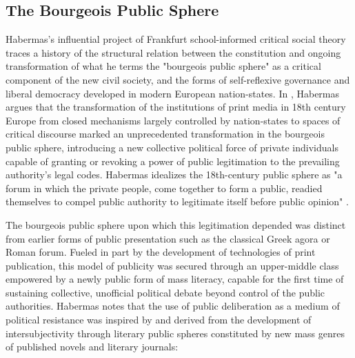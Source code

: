 \subsection*{The Bourgeois Public Sphere}
Habermas's influential project of Frankfurt school-informed critical social theory traces a history of the structural relation between the constitution and ongoing transformation of what he terms the "bourgeois public sphere" as a critical component of the new civil society, and the forms of self-reflexive governance and liberal democracy developed in modern European nation-states. In , Habermas argues that the transformation of the institutions of print media in 18th century Europe from closed mechanisms largely controlled by nation-states to spaces of critical discourse marked an unprecedented transformation in the bourgeois public sphere, introducing a new collective political force of private individuals capable of granting or revoking a power of public legitimation to the prevailing authority's legal codes. Habermas idealizes the 18th-century public sphere as "a forum in which the private people, come together to form a public, readied themselves to compel public authority to legitimate itself before public opinion" \autocite*[25--6]{Habermas1989}.

The bourgeois public sphere upon which this legitimation depended was distinct from earlier forms of public presentation such as the classical Greek agora or Roman forum. Fueled in part by the development of technologies of print publication, this model of publicity was secured through an upper-middle class empowered by a newly public form of mass literacy, capable for the first time of sustaining collective, unofficial political debate beyond control of the public authorities. Habermas notes that the use of public deliberation as a medium of political resistance was inspired by and derived from the development of intersubjectivity through literary public spheres constituted by new mass genres of published novels and literary journals:

